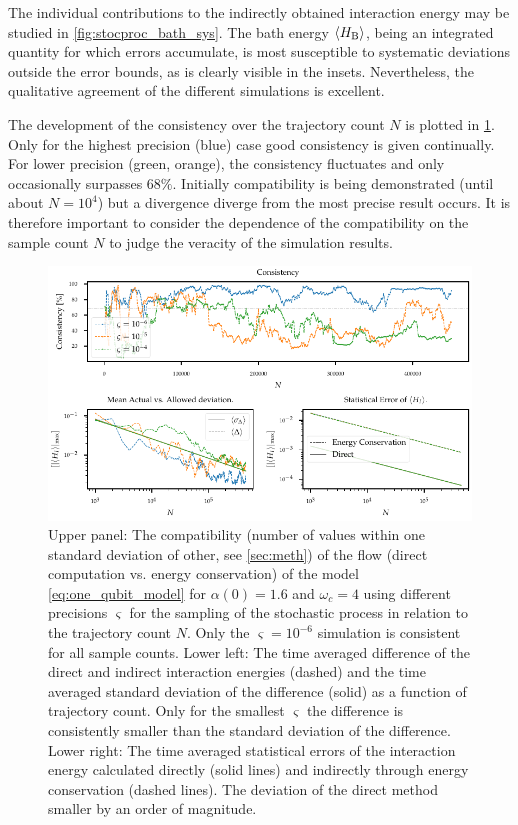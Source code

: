 The individual contributions to the indirectly obtained interaction
energy may be studied in \cref{fig:stocproc_bath_sys}. The bath energy
\(\ev{H_{\bath}}\), being an integrated quantity for which errors
accumulate, is most susceptible to systematic deviations outside the
error bounds, as is clearly visible in the insets. Nevertheless, the
qualitative agreement of the different simulations is excellent.

The development of the consistency over the trajectory count \(N\) is
plotted in \cref{fig:stocproc_consistency_dev}. Only for the highest
precision (blue) case good consistency is given continually. For lower
precision (green, orange), the consistency fluctuates and only
occasionally surpasses \(68\%\). Initially compatibility is being
demonstrated (until about \(N=10^4\)) but a divergence diverge from
the most precise result occurs. It is therefore important to consider
the dependence of the compatibility on the sample count \(N\) to judge
the veracity of the simulation results.
\begin{figure}[htp]
  \centering
  \includegraphics{figs/one_bath_syst/stocproc_systematics_consistency}
  \caption{\label{fig:stocproc_consistency_dev} Upper panel: The
    compatibility (number of values within one standard deviation of
    other, see \cref{sec:meth}) of the flow (direct computation
    vs. energy conservation) of the model \cref{eq:one_qubit_model}
    for \(α(0)=1.6\) and \(ω_c=4\) using different precisions
    \(\varsigma\) for the sampling of the stochastic process in
    relation to the trajectory count \(N\). Only the
    \(\varsigma=10^{-6}\) simulation is consistent for all sample
    counts. Lower left: The time averaged difference of the direct and
    indirect interaction energies (dashed) and the time averaged
    standard deviation of the difference (solid) as a function of
    trajectory count. Only for the smallest \(\varsigma\) the
    difference is consistently smaller than the standard deviation of
    the difference. Lower right: The time averaged statistical errors
    of the interaction energy calculated directly (solid lines) and
    indirectly through energy conservation (dashed lines). The
    deviation of the direct method smaller by an order of magnitude.}
\end{figure}

